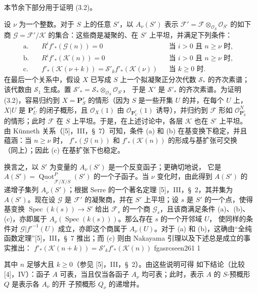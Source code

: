 \documentclass[12pt,twoside,openany]{book}
\numberwithin{equation}{section}
\newcommand{\fgaunitid}{unbound}
\newcommand{\src}[1]{%
  \phantomsection
  \hypertarget{src:\fgaunitid:#1}{}%
  \hypertarget{fga.\fgaunitid.p#1}{}%
  \ifcsname fgasrcseen#1\endcsname\else
    \expandafter\gdef\csname fgasrcseen#1\endcsname{1}%
    \hypertarget{src:#1}{}%
  \fi
  \marginpar{\raggedleft\footnotesize\sffamily #1}%
}
\theoremstyle{plain}
\theoremstyle{definition}
\theoremstyle{remark}
\begin{document}
本节余下部分用于证明 (3.2)。

设 $\nu$ 为一个整数。对于 $S$ 上的任意 $S'$，以 $A_\nu(S')$
表示 $\mathcal F'=\mathcal F\otimes_{\mathcal O_S}\mathcal O_{S'}$
的如下商
$\mathcal G=\mathcal F'/\mathcal K$ 的集合：这些商是凝聚的、在
$S'$ 上平坦，并满足下列条件：
\begin{align*}
\text{a.}\quad &R^if'_*(\mathcal G(n))=0 &&\text{当 $i>0$ 且 $n\geq\nu$ 时},\\
\text{b.}\quad &R^if'_*(\mathcal K(n))=0 &&\text{当 $i>0$ 且 $n\geq\nu$ 时},\\
\text{c.}\quad &f'_*(\mathcal K(\nu+k))
=\mathcal S'_k f'_*(\mathcal K(\nu)) &&\text{当 $k\geq0$ 时}.
\end{align*}
在最后一个关系中，假设 $X$ 已写成 $S$ 上一个拟凝聚正分次代数
$\mathcal S_*$ 的齐次素谱；该代数由 $\mathcal S_1$ 生成。置
$\mathcal S'_* =\mathcal S_*\otimes_{\mathcal O_S}\mathcal O_{S'}$，
于是 $X'$ 是 $\mathcal S'_*$ 的齐次素谱。为证明 (3.2)，容易归约到
$X=\mathbf P^r_S$ 的情形（因为 $S$ 是一些开集 $U$ 的并，在每个
$U$ 上，$X|U$ 是 $\mathbf P^r_U$ 的闭子概形，且
$\mathcal O_X(1)$ 由 $\mathcal O_{\mathbf P^r_U}(1)$ 诱导），并归约到
$\mathcal F$ 形如 $\mathcal O_{\mathbf P^r_S}^{N}$ 的情形；此时
$\mathcal F$ 在 $S$ 上平坦。于是，在上述讨论中，各层 $\mathcal K$
也在 $S'$ 上平坦。由 Künneth 关系（[5]，III，\S~7）可知，条件
(a) 和 (b) 在基变换下稳定，并且蕴涵：当 $n\geq\nu$ 时，
$f'_*(\mathcal G(n))$ 和 $f'_*(\mathcal K(n))$ 的形成与基扩张可交换
（同上）；因此 (c) 在基扩张下也稳定。

换言之，以 $S'$ 为变量的 $A_\nu(S')$ 是一个反变函子；更确切地说，
它是
$A(S')=\underline{\operatorname{Quot}}^P_{\mathcal F/X/S}(S')$
的一个子函子。当 $\nu$ 变化时，由此得到 $A(S')$ 的递增子集列
$A_\nu(S')$；根据 Serre 的一个著名定理 [5]，III，\S~2，其并集为
$A(S')$。现在设 $\mathcal G$ 是 $\mathcal F'$ 的凝聚商，并在 $S'$
上平坦；设 $s$ 是 $S'$ 的一个点，使得基变换
$\operatorname{Spec}(k(s))\longrightarrow S'$ 给出 $\mathcal F_s$
的一个商 $\mathcal G_s$，且该商满足条件 (a)、(b)、(c)，亦即属于
$A_\nu(\operatorname{Spec}(k(s)))$。那么存在 $s$ 的一个开邻域 $U$，
使同样的条件对 $\mathcal G|f'^{-1}(U)$ 成立，亦即这个商属于
$A_\nu(U)$。对于 (a) 和 (b)，这确由“全纯函数定理”[5]，III，\S~7
推出；而 (c) 则由 Nakayama 引理以及下述总是成立的事实推出：
$f'_*(\mathcal K(n+k))=\mathcal S'_k f'_*(\mathcal K(n))$
\src{261}
其中 $n$ 足够大且 $k\geq0$（参见 [5]，III，\S~2）。由这些说明可得
如下结论（比较 [4]，IV）：函子 $A$ 可表，当且仅当各函子 $A_\nu$
均可表；此时，表示 $A$ 的 $S$-预概形 $Q$ 是表示各 $A_\nu$ 的开
子预概形 $Q_\nu$ 的递增并。
\end{document}
